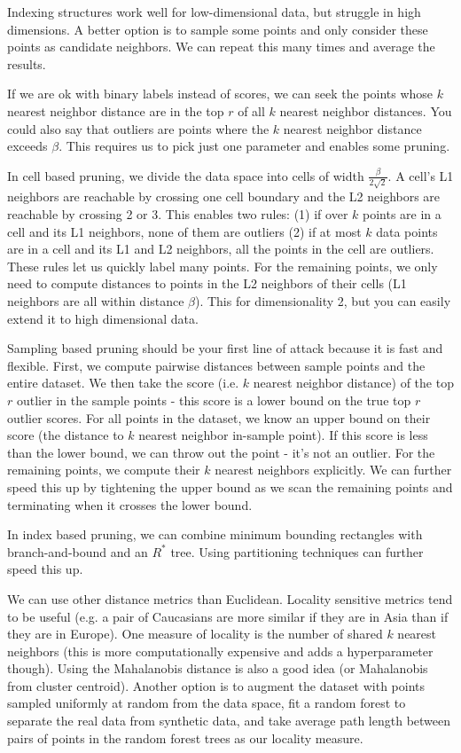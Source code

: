 \documentclass[a4paper]{article}
\begin{document}
Indexing structures work well for low-dimensional data, but struggle in high
dimensions. A better option is to sample some points and only consider these
points as candidate neighbors. We can repeat this many times and average the
results.

If we are ok with binary labels instead of scores, we can seek the points whose
$k$ nearest neighbor distance are in the top $r$ of all $k$ nearest neighbor
distances. You could also say that outliers are points where the $k$ nearest
neighbor distance exceeds $\beta$.
This requires us to pick just one parameter and enables some pruning.

In cell based pruning, we divide the data space into cells of width
$\frac{\beta}{2\sqrt{2}}$. A cell's L1 neighbors are reachable by crossing
one cell boundary and the L2 neighbors are reachable by crossing 2 or 3. This
enables two rules: (1) if over $k$ points are in a cell and its L1 neighbors,
none of them are outliers (2) if at most $k$ data points are in a cell and its
L1 and L2 neighbors, all the points in the cell are outliers. These rules let
us quickly label many points. For the remaining points, we only need to
compute distances to points in the L2 neighbors of their cells (L1 neighbors
are all within distance $\beta$). This for dimensionality 2, but you can easily
extend it to high dimensional data.

Sampling based pruning should be your first line of attack because it is fast
and flexible. First, we compute pairwise distances between sample points and
the entire dataset. We then take the score (i.e. $k$ nearest neighbor distance)
of the top $r$ outlier in the sample points - this score is a lower bound on
the true top $r$ outlier scores. For all points in the dataset, we know an
upper bound on their score (the distance to $k$ nearest neighbor in-sample
point). If this score is less than the lower bound, we can throw out the point
- it's not an outlier. For the remaining points, we compute their $k$ nearest
neighbors explicitly. We can further speed this up by tightening the upper
bound as we scan the remaining points and terminating when it crosses the lower
bound.

In index based pruning, we can combine minimum bounding rectangles with
branch-and-bound and an $R^{*}$ tree. Using partitioning techniques can
further speed this up.

We can use other distance metrics than Euclidean. Locality sensitive metrics
tend to be useful (e.g. a pair of Caucasians are more similar if they are
in Asia than if they are in Europe). One measure of locality is the number
of shared $k$ nearest neighbors (this is more computationally expensive and adds
a hyperparameter though). Using the Mahalanobis distance is also a good idea
(or Mahalanobis from cluster centroid).
Another option is to augment the dataset with points sampled uniformly at
random from the data space, fit a random forest to separate the real data
from synthetic data, and take average path length between pairs of points
in the random forest trees as our locality measure.
\end{document}
